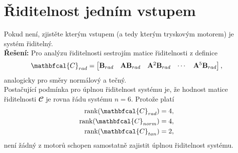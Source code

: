 \documentclass[twoside]{article}
\begin{document}
\section{Řiditelnost jedním vstupem}
\label{sec:ukol2}
Pokud není, zjistěte kterým vstupem (a tedy kterým tryskovým motorem) je systém řiditelný. \\
\textbf{Řešení:}
Pro analýzu řiditelnosti sestrojím matice řiditelnosti z definice
\begin{equation}
	\mathbfcal{C}_\rad = \begin{bmatrix}
		\mathbf{B}_\rad & \mathbf{A}\mathbf{B}_\rad & \mathbf{A}^2 \mathbf{B}_\rad & \cdots & \mathbf{A}^5 \mathbf{B}_\rad
	\end{bmatrix},
	\label{eq:riditelnost}
\end{equation}
analogicky pro směry normálový a tečný.\\
Postačující podmínka pro úplnou řiditelnost systému je, že hodnost matice řiditelnosti $\mathbfcal{C}$ je rovna řádu systému $n=6$. Protože platí
\begin{equation*}
	\begin{split}
		\text{rank}(\mathbfcal{C}_\rad) &= 4, \\
		\text{rank}(\mathbfcal{C}_\norm) &= 4, \\
		\text{rank}(\mathbfcal{C}_\tan) &= 2, \\
	\end{split}
\end{equation*}
není žádný z motorů schopen samostatně zajistit úplnou řiditelnost systému.
\end{document}
